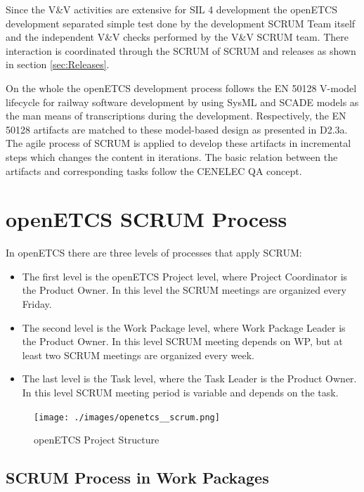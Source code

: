Since the V\&V activities are extensive for SIL 4 development the openETCS development separated simple test done by the development SCRUM Team itself and the independent V\&V checks performed by the V\&V SCRUM team. There interaction is coordinated through the SCRUM of SCRUM and releases as shown in section \ref{sec:Releases}.

On the whole the openETCS development process follows the EN 50128 V-model lifecycle for railway software development by using SysML and SCADE models as the man means of transcriptions during the development. Respectively, the EN 50128 artifacts are matched to these model-based design as presented in D2.3a. The agile process of SCRUM is applied to  develop these artifacts in incremental steps which changes the content in iterations. The basic relation between the artifacts and corresponding tasks follow the CENELEC QA concept.


\chapter{openETCS SCRUM Process}
\label{sec:ScrumProzess}

In openETCS there are three levels of processes that apply SCRUM:
\begin{itemize}
	\item The first level is the openETCS Project level, where Project Coordinator is the Product Owner. In this level the SCRUM meetings are organized every Friday.
	\item The second level is the Work Package level, where Work Package Leader is the Product Owner. In this level SCRUM meeting depends on WP, but at least two SCRUM meetings are organized every week.
	\item The last level is the Task level, where the Task Leader is the Product Owner. In this level SCRUM meeting period is variable and depends on the task.
\end{itemize}

\begin{figure}[h]
	\centering
	\texttt{[image: ./images/openetcs\_\_scrum.png]}
	\caption{openETCS Project Structure}
\end{figure}

\section{SCRUM Process in Work Packages}

